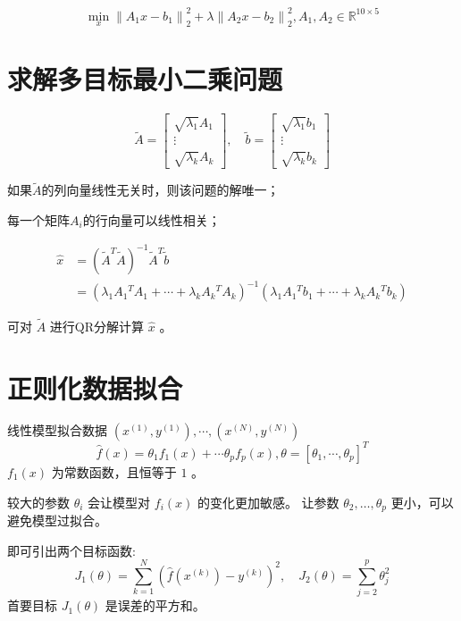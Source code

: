 \begin{example}[双目标规划问题]
    $$ \min _{x}\left\|A_{1} x-b_{1}\right\|_{2}^{2}+\lambda\left\|A_{2} x-b_{2}\right\|_{2}^{2}, A_{1}, A_{2} \in \mathbb{R}^{10 \times 5} $$


\end{example}


\section{求解多目标最小二乘问题}

$$
\tilde{A}=\left[\begin{array}{c}
\sqrt{\lambda_{1}} A_{1} \\
\vdots \\
\sqrt{\lambda_{k}} A_{k}
\end{array}\right], \quad \tilde{b}=\left[\begin{array}{c}
\sqrt{\lambda_{1}} b_{1} \\
\vdots \\
\sqrt{\lambda_{k}} b_{k}
\end{array}\right]
$$


如果$\tilde{A}$的列向量线性无关时，则该问题的解唯一；

每一个矩阵$A_i$的行向量可以线性相关；

$$\begin{aligned} \hat{x}&=\left(\tilde{A}^{T} \tilde{A}\right)^{-1} \tilde{A}^{T} \tilde{b} \\
&= \left(\lambda_{1} A_{1}{ }^{T} A_{1}+\cdots+\lambda_{k} A_{k}{ }^{T} A_{k}\right)^{-1}\left(\lambda_{1} A_{1}{ }^{T} b_{1}+\cdots+\lambda_{k} A_{k}{ }^{T} b_{k}\right) \end{aligned} $$

可对 $ \tilde{A} $ 进行QR分解计算 $ \hat{x} $ 。

\section{正则化数据拟合}

线性模型拟合数据 $ \left(x^{(1)}, y^{(1)}\right), \cdots,\left(x^{(N)}, y^{(N)}\right) $
$$
\hat{f}(x)=\theta_{1} f_{1}(x)+\cdots \theta_{p} f_{p}(x), \theta=\left[\theta_{1}, \cdots, \theta_{p}\right]^{T}
$$
$ f_{1}(x) $ 为常数函数，且恒等于 $1$ 。

较大的参数 $ \theta_{i} $ 会让模型对 $ f_{i}(x) $ 的变化更加敏感。 让参数 $ \theta_{2}, \ldots, \theta_{p} $ 更小，可以避免模型过拟合。

即可引出两个目标函数:
$$
J_{1}(\theta)=\sum_{k=1}^{N}\left(\hat{f}\left(x^{(k)}\right)-y^{(k)}\right)^{2}, \quad J_{2}(\theta)=\sum_{j=2}^{p} \theta_{j}^{2}
$$
首要目标 $ J_{1}(\theta) $ 是误差的平方和。

